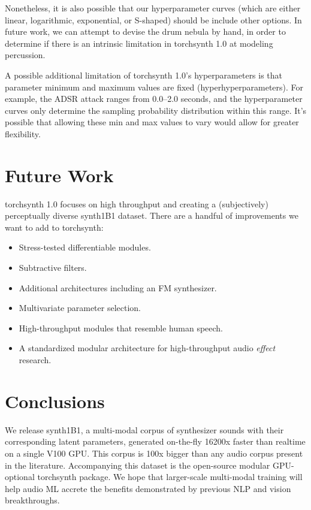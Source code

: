 Nonetheless, it is also possible that our hyperparameter curves (which are either linear, logarithmic, exponential, or S-shaped) should be include other options. In future work, we can attempt to devise the drum nebula by hand, in order to determine if there is an intrinsic limitation in torchsynth 1.0 at modeling percussion.

A possible additional limitation of torchsynth 1.0's hyperparameters is that parameter minimum and maximum values are fixed (hyperhyperparameters). For example, the ADSR attack ranges from 0.0--2.0 seconds, and the hyperparameter curves only determine the sampling probability distribution within this range. It's possible that allowing these min and max values to vary would allow for greater flexibility.
\fi

\section{Future Work}

torchsynth 1.0 focuses on high throughput and creating a (subjectively) perceptually diverse synth1B1 dataset. %
There are a handful of improvements we want to add to torchsynth:
\begin{itemize}
\item Stress-tested differentiable modules.
\item Subtractive filters.
\item Additional architectures including an FM synthesizer.
\item Multivariate parameter selection.
\item High-throughput modules that resemble human speech.
\item A standardized modular architecture for high-throughput audio {\em effect} research.
\end{itemize}


\section{Conclusions}

We release synth1B1, a multi-modal corpus of synthesizer sounds with their corresponding latent parameters, generated on-the-fly 16200x faster than realtime on a single V100 GPU. This corpus is 100x bigger than any audio corpus present in the literature. Accompanying this dataset is the open-source modular GPU-optional torchsynth package. We hope that larger-scale multi-modal training will help audio ML accrete the benefits demonstrated by previous NLP and vision breakthroughs.

